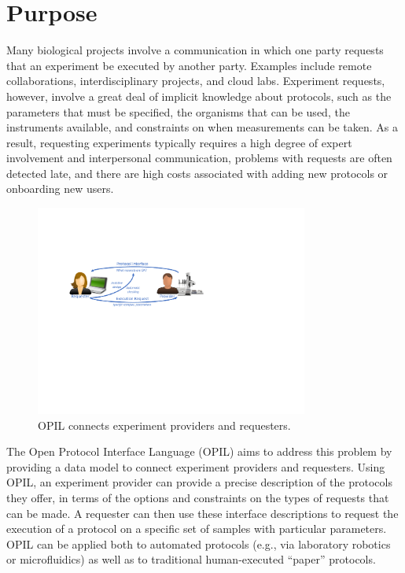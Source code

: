 \section{Purpose}

Many biological projects involve a communication in which one party requests that an experiment be executed by another party. 
Examples include remote collaborations, interdisciplinary projects, and cloud labs.
Experiment requests, however, involve a great deal of implicit knowledge about protocols, such as
the parameters that must be specified, the organisms that can be used, the instruments available, and constraints on when measurements can be taken.
As a result, 
requesting experiments typically requires a high degree of expert involvement and interpersonal communication, 
problems with requests are often detected late, 
and there are high costs associated with adding new protocols or onboarding new users.

\begin{figure}[htbp!]
\centering
\includegraphics[width=0.8\textwidth]{figures/architecture.pdf}
\caption{OPIL connects experiment providers and requesters.}
\label{f:sequence}
\end{figure}

The Open Protocol Interface Language (OPIL) aims to address this problem by providing a data model to connect experiment providers and requesters.
Using OPIL, an experiment provider can provide a precise description of the protocols they offer, in terms of the options and constraints on the types of requests that can be made.
A requester can then use these interface descriptions to request the execution of a protocol on a specific set of samples with particular parameters.
OPIL can be applied both to automated protocols (e.g., via laboratory robotics or microfluidics) as well as to traditional human-executed ``paper'' protocols.

